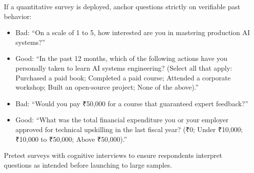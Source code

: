 If a quantitative survey is deployed, anchor questions strictly on verifiable past behavior:
\begin{itemize}[leftmargin=1.2em,itemsep=0.2ex]
  \item Bad: ``On a scale of 1 to 5, how interested are you in mastering production AI systems?''
  \item Good: ``In the past 12 months, which of the following actions have you personally taken to learn AI systems engineering? (Select all that apply: Purchased a paid book; Completed a paid course; Attended a corporate workshop; Built an open-source project; None of the above).''
  \item Bad: ``Would you pay ₹50,000 for a course that guaranteed expert feedback?''
  \item Good: ``What was the total financial expenditure you or your employer approved for technical upskilling in the last fiscal year? (₹0; Under ₹10,000; ₹10,000 to ₹50,000; Above ₹50,000).''
\end{itemize}
Pretest surveys with cognitive interviews to ensure respondents interpret questions as intended before launching to large samples.
